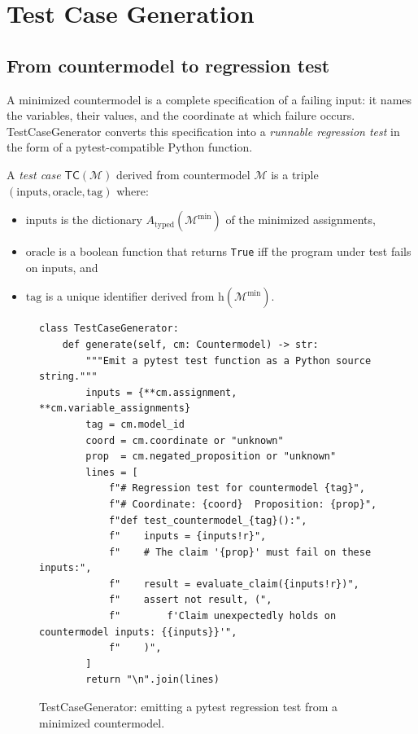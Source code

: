 \documentclass[11pt]{article}
\newcommand{\CMod}{\mathcal{M}}            %
\newcommand{\CMin}{\mathcal{M}^{\min}}     %
\newcommand{\TestCase}{\mathsf{TC}}        %
\newcommand{\hash}{\mathrm{h}}             %
\begin{document}
\section{Test Case Generation}
\label{sec:testgen}

\subsection{From countermodel to regression test}

A minimized countermodel is a complete specification of a failing input:
it names the variables, their values, and the coordinate at which failure
occurs.  \textsf{TestCaseGenerator} converts this specification into a
\emph{runnable regression test} in the form of a pytest-compatible
Python function.

\begin{definition}\label{def:testcase}
A \emph{test case} $\TestCase(\CMod)$ derived from countermodel
$\CMod$ is a triple $(\mathrm{inputs}, \mathrm{oracle}, \mathrm{tag})$
where:
\begin{itemize}[leftmargin=1.5em]
  \item $\mathrm{inputs}$ is the dictionary $A_{\mathrm{typed}}(\CMin)$
        of the minimized assignments,
  \item $\mathrm{oracle}$ is a boolean function that returns \texttt{True}
        iff the program under test fails on $\mathrm{inputs}$, and
  \item $\mathrm{tag}$ is a unique identifier derived from
        $\hash(\CMin)$.
\end{itemize}
\end{definition}

\begin{figure}[ht]
\begin{lstlisting}[style=jugeo-python]
class TestCaseGenerator:
    def generate(self, cm: Countermodel) -> str:
        """Emit a pytest test function as a Python source string."""
        inputs = {**cm.assignment, **cm.variable_assignments}
        tag = cm.model_id
        coord = cm.coordinate or "unknown"
        prop  = cm.negated_proposition or "unknown"
        lines = [
            f"# Regression test for countermodel {tag}",
            f"# Coordinate: {coord}  Proposition: {prop}",
            f"def test_countermodel_{tag}():",
            f"    inputs = {inputs!r}",
            f"    # The claim '{prop}' must fail on these inputs:",
            f"    result = evaluate_claim({inputs!r})",
            f"    assert not result, (",
            f"        f'Claim unexpectedly holds on countermodel inputs: {{inputs}}'",
            f"    )",
        ]
        return "\n".join(lines)
\end{lstlisting}
\caption{\textsf{TestCaseGenerator}: emitting a pytest regression test
         from a minimized countermodel.}
\label{fig:testgen}
\end{figure}
\end{document}
